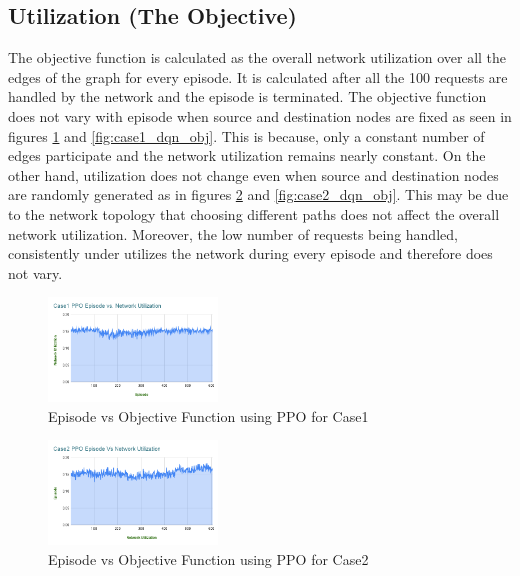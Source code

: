 \documentclass[conference]{IEEEtran}
\begin{document}
\subsection{Utilization (The Objective)}
\vspace{0.5em}
The objective function is calculated as the overall network utilization over all the edges of the graph for every episode. It is calculated after all the 100 requests are handled by the network and the episode is terminated. The objective function does not vary with episode when source and destination nodes are fixed as seen in figures \ref{fig:case1_ppo_obj} and \ref{fig:case1_dqn_obj}. This is because, only a constant number of edges participate and the network utilization remains nearly constant. On the other hand, utilization does not change even when source and destination nodes are randomly generated as in figures \ref{fig:case2_ppo_obj} and \ref{fig:case2_dqn_obj}. This may be due to the network topology that choosing different paths does not affect the overall network utilization. Moreover, the low number of requests being handled, consistently under utilizes the network during every episode and therefore does not vary.
\vspace{\baselineskip}
\begin{figure}[h]
    \centering
    \includegraphics[width=0.4\textwidth]{Figures/Case1 PPO Episode vs. Network Utilization.png}
    \caption{Episode vs Objective Function using PPO for Case1}
    \label{fig:case1_ppo_obj}
\end{figure}

\vspace{\baselineskip}
\begin{figure}[h]
    \centering
    \includegraphics[width=0.4\textwidth]{Figures/Case2 PPO Episode Vs Network Utilization.png}
    \caption{Episode vs Objective Function using PPO for Case2}
    \label{fig:case2_ppo_obj}
\end{figure}
\end{document}
